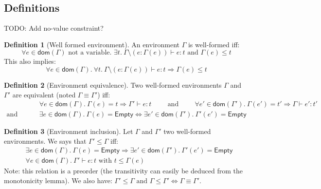 \documentclass[a4paper]{article}%
\newcommand{\dom}[1]{\textsf{dom}(#1)}
\newcommand{\Empty} {\textsf{Empty}}%
\theoremstyle{definition}
\newtheorem{definition}{Definition}
\begin{document}
      \subsection{Definitions}

      TODO: Add no-value constraint?
      
      \begin{definition}[Well formed environment]
        An environment $\Gamma$ is well-formed iff:
        \[
          \forall e \in \dom \Gamma \text{ not a variable. } \exists t.\ \Gamma\setminus(e:\Gamma(e)) \vdash e : t \text{ and } \Gamma(e) \leq t
        \]
        This also implies:
        \[
          \forall e \in \dom \Gamma.\ \forall t.\ \Gamma\setminus(e:\Gamma(e)) \vdash e : t \Rightarrow \Gamma(e) \leq t
        \]
      \end{definition}

      \begin{definition}[Environment equivalence]
        Two well-formed environments $\Gamma$ and $\Gamma'$ are equivalent (noted $\Gamma \equiv \Gamma'$) iff:
        \begin{align*} 
          &\forall e \in \dom \Gamma.\ \Gamma(e)=t \Rightarrow \Gamma' \vdash e:t \hspace{1cm} \text{and} \hspace{1cm}
          \forall e' \in \dom {\Gamma'}.\ \Gamma(e')=t' \Rightarrow \Gamma \vdash e':t' \\
          \text{and} \hspace{1cm} &\exists e\in \dom \Gamma.\ \Gamma(e)=\Empty \Leftrightarrow \exists e'\in \dom {\Gamma'}.\ \Gamma'(e')=\Empty
        \end{align*}
      \end{definition}
    
      \begin{definition}[Environment inclusion]
        Let $\Gamma$ and $\Gamma'$ two well-formed environments. We says that $\Gamma' \leq \Gamma$ iff:
        \begin{align*}
          &\exists e\in \dom \Gamma.\ \Gamma(e)=\Empty \Rightarrow \exists e'\in \dom {\Gamma'}.\ \Gamma'(e')=\Empty\\
          &\forall e \in \dom \Gamma.\ \Gamma' \vdash e : t \text{ with } t \leq \Gamma(e)
        \end{align*}
        Note: this relation is a preorder (the transitivity can easily be deduced from the monotonicity lemma).
        We also have: $\Gamma' \leq \Gamma \text{ and } \Gamma \leq \Gamma' \Leftrightarrow \Gamma \equiv \Gamma'$.
      \end{definition}
    
\end{document}
